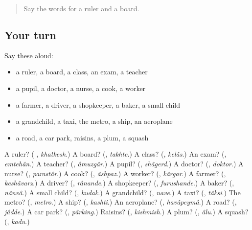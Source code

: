 \label{lesson:FA-R118-second-pass-school-work-and-getting-around}



\begin{quote}
Say the words for a ruler and a board.
\end{quote}

\subsection*{Your turn}
Say these aloud:

\begin{itemize}
\raggedright
  \item a ruler, a board, a class, an exam, a teacher
  \item a pupil, a doctor, a nurse, a cook, a worker
  \item a farmer, a driver, a shopkeeper, a baker, a small child
  \item a grandchild, a taxi, the metro, a ship, an aeroplane
  \item a road, a car park, raisins, a plum, a squash
\end{itemize}

\begin{tcolorbox}[breakable,colback=teal!4,colframe=teal!35!black,title={Before you move on}]
A ruler? (\textbf{ }, \emph{khatkesh}.) A board? (\textbf{}, \emph{takhte}.) A class? (\textbf{}, \emph{kelâs}.) An exam? (\textbf{}, \emph{emtehân}.) A teacher? (\textbf{}, \emph{âmuzgâr}.) A pupil? (\textbf{}, \emph{shâgerd}.) A doctor? (\textbf{}, \emph{doktor}.) A nurse? (\textbf{}, \emph{parastâr}.) A cook? (\textbf{}, \emph{âshpaz}.) A worker? (\textbf{}, \emph{kârgar}.) A farmer? (\textbf{}, \emph{keshâvarz}.) A driver? (\textbf{}, \emph{rânande}.) A shopkeeper? (\textbf{}, \emph{furushande}.) A baker? (\textbf{}, \emph{nânvâ}.) A small child? (\textbf{}, \emph{kudak}.) A grandchild? (\textbf{}, \emph{nave}.) A taxi? (\textbf{}, \emph{tâksi}.) The metro? (\textbf{}, \emph{metro}.) A ship? (\textbf{}, \emph{kashti}.) An aeroplane? (\textbf{}, \emph{havâpeymâ}.) A road? (\textbf{}, \emph{jâdde}.) A car park? (\textbf{}, \emph{pârking}.) Raisins? (\textbf{}, \emph{kishmish}.) A plum? (\textbf{}, \emph{âlu}.) A squash? (\textbf{}, \emph{kadu}.)
\end{tcolorbox}

